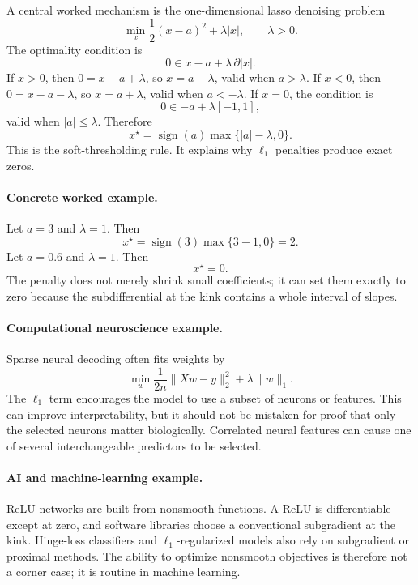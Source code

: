 A central worked mechanism is the one-dimensional lasso denoising problem
\[
\min_x \frac12(x-a)^2+\lambda |x|,
\qquad \lambda>0.
\]
The optimality condition is
\[
0\in x-a+\lambda\,\partial |x|.
\]
If \(x>0\), then \(0=x-a+\lambda\), so \(x=a-\lambda\), valid when \(a>\lambda\). If \(x<0\), then \(0=x-a-\lambda\), so \(x=a+\lambda\), valid when \(a<-\lambda\). If \(x=0\), the condition is
\[
0\in -a+\lambda[-1,1],
\]
valid when \(|a|\le\lambda\). Therefore
\[
\boxed{
x^\star=\operatorname{sign}(a)\max\{|a|-\lambda,0\}.
}
\]
This is the soft-thresholding rule. It explains why \(\ell_1\) penalties produce exact zeros.

\paragraph{Concrete worked example.}
Let \(a=3\) and \(\lambda=1\). Then
\[
x^\star=\operatorname{sign}(3)\max\{3-1,0\}=2.
\]
Let \(a=0.6\) and \(\lambda=1\). Then
\[
x^\star=0.
\]
The penalty does not merely shrink small coefficients; it can set them exactly to zero because the subdifferential at the kink contains a whole interval of slopes.

\paragraph{Computational neuroscience example.}
Sparse neural decoding often fits weights by
\[
\min_w \frac{1}{2n}\|Xw-y\|_2^2+\lambda\|w\|_1.
\]
The \(\ell_1\) term encourages the model to use a subset of neurons or features. This can improve interpretability, but it should not be mistaken for proof that only the selected neurons matter biologically. Correlated neural features can cause one of several interchangeable predictors to be selected.

\paragraph{AI and machine-learning example.}
ReLU networks are built from nonsmooth functions. A ReLU is differentiable except at zero, and software libraries choose a conventional subgradient at the kink. Hinge-loss classifiers and \(\ell_1\)-regularized models also rely on subgradient or proximal methods. The ability to optimize nonsmooth objectives is therefore not a corner case; it is routine in machine learning.

